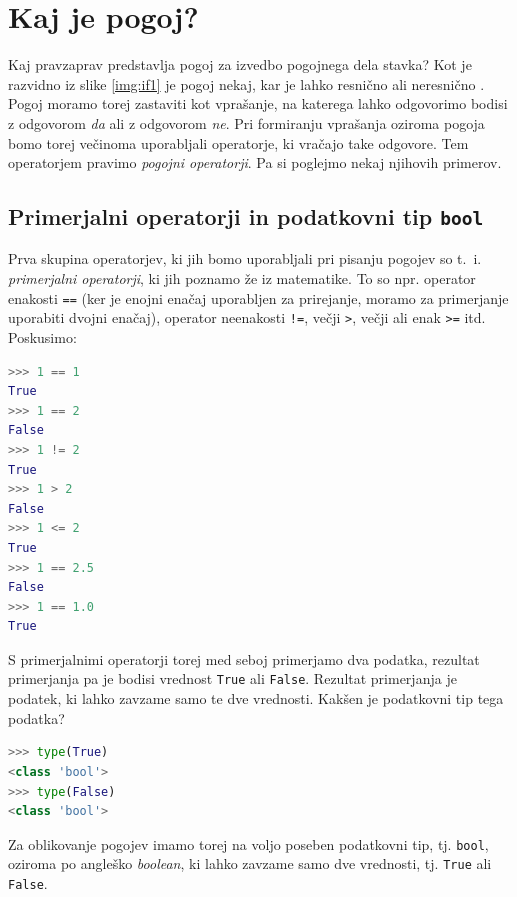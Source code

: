 \section{Kaj je pogoj?}

Kaj pravzaprav predstavlja pogoj za izvedbo pogojnega dela stavka? Kot je razvidno iz slike \ref{img:if1} je pogoj nekaj, kar je lahko resnično  ali neresnično . Pogoj moramo torej zastaviti kot vprašanje, na katerega lahko odgovorimo bodisi z odgovorom \emph{da} ali z odgovorom \emph{ne}. Pri formiranju vprašanja oziroma pogoja bomo torej večinoma uporabljali operatorje, ki vračajo take odgovore. Tem operatorjem pravimo \emph{pogojni operatorji}. Pa si poglejmo nekaj njihovih primerov.

\subsection{Primerjalni operatorji in podatkovni tip \texttt{bool}}

Prva skupina operatorjev, ki jih bomo uporabljali pri pisanju pogojev so t.~i. \emph{primerjalni operatorji}, ki jih poznamo že iz matematike. To so npr. operator enakosti \texttt{==} (ker je enojni enačaj uporabljen za prirejanje, moramo za primerjanje uporabiti dvojni enačaj), operator neenakosti \texttt{!=}, večji \texttt{>}, večji ali enak \texttt{>=} itd. Poskusimo:
\begin{lstlisting}[language=Python]
>>> 1 == 1
True
>>> 1 == 2
False
>>> 1 != 2
True
>>> 1 > 2
False
>>> 1 <= 2
True
>>> 1 == 2.5
False
>>> 1 == 1.0
True
\end{lstlisting}
S primerjalnimi operatorji torej med seboj primerjamo dva podatka, rezultat primerjanja pa je bodisi vrednost \texttt{True} ali \texttt{False}. Rezultat primerjanja je podatek, ki lahko zavzame samo te dve vrednosti. Kakšen je podatkovni tip tega podatka?
\begin{lstlisting}[language=Python]
>>> type(True)
<class 'bool'>
>>> type(False)
<class 'bool'>
\end{lstlisting}
Za oblikovanje pogojev imamo torej na voljo poseben podatkovni tip, tj. \texttt{bool}, oziroma po angleško \emph{boolean}, ki lahko zavzame samo dve vrednosti, tj. \texttt{True} ali \texttt{False}. 

